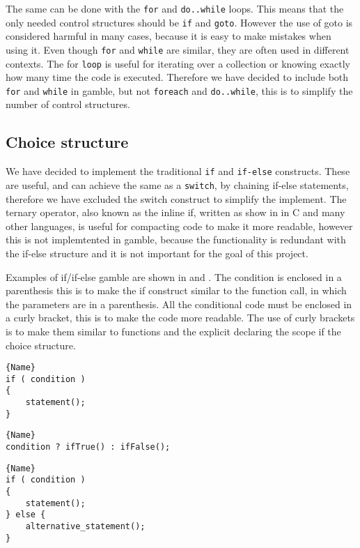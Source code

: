 The same can be done with the \texttt{for} and \texttt{do..while} loops. 
This means that the only needed control structures should be \texttt{if} and \texttt{goto}. 
However the use of goto is considered harmful in many cases, because it is easy to make mistakes when using it. \citep{DijkstraGoto}
Even though \texttt{for} and \texttt{while} are similar, they are often used in different contexts.
The for \texttt{loop} is useful for iterating over a collection or knowing exactly how many time the code is executed. 
Therefore we have decided to include both \texttt{for} and \texttt{while} in \gls{gamble}, but not \texttt{foreach} and \texttt{do..while}, this is to simplify the number of control structures.

\subsection{Choice structure}
We have decided to implement the traditional \texttt{if} and \texttt{if-else} constructs. 
These are useful, and can achieve the same as a \texttt{switch}, by chaining if-else statements, therefore we have excluded the switch construct to simplify the implement. 
The ternary operator, also known as the inline if, written as show in  in C and many other languages, is useful for compacting code to make it more readable, however this is not implemtented in \gls{gamble}, because the functionality is redundant with the if-else structure and it is not important for the goal of this project.

Examples of if/if-else \gls{gamble} are shown in  and . 
The condition is enclosed in a parenthesis this is to make the if construct similar to the function call, in which the parameters are in a parenthesis. 
All the conditional code must be enclosed in a curly bracket, this is to make the code more readable. 
The use of curly brackets is to make them similar to functions and the explicit declaring the scope if the choice structure.

\noindent\begin{minipage}{.45\textwidth}
\begin{lstlisting}[caption=An if construct in \gls{gamble}.,frame=tlrb, label=iflst, numbers=none]{Name}
if ( condition )
{
    statement();
}
\end{lstlisting}
\begin{lstlisting}[caption=A use of \texttt{?:} in \gls{gamble}.,frame=tlrb, label=terlst, numbers=none]{Name}
condition ? ifTrue() : ifFalse();
\end{lstlisting}

\end{minipage}\hfill
\begin{minipage}{.45\textwidth}
\begin{lstlisting}[caption=An if-else construct in \gls{gamble}.,frame=tlrb, label=ifelselst, numbers=none]{Name}
if ( condition )
{
    statement();
} else {
    alternative_statement();
}
\end{lstlisting}
\end{minipage}

